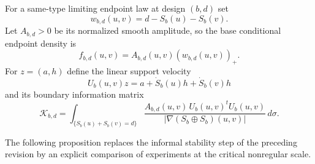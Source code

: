For a same-type limiting endpoint law at design $(b,d)$ set
\begin{equation}\label{eq:v21-base-defining-function}
 w_{b,d}(u,v)=d-S_b(u)-S_b(v).
\end{equation}
Let $A_{b,d}>0$ be its normalized smooth amplitude, so the base conditional
endpoint density is
\[
 f_{b,d}(u,v)=A_{b,d}(u,v)(w_{b,d}(u,v))_+.
\]
For $z=(a,h)$ define the linear support velocity
\begin{equation}\label{eq:v21-support-velocity}
 U_b(u,v)z=a+\dot S_b(u)h+\dot S_b(v)h
\end{equation}
and its boundary information matrix
\begin{equation}\label{eq:v21-information-matrix}
 \mathcal K_{b,d}
 =\int_{\{S_b(u)+S_b(v)=d\}}
 \frac{A_{b,d}(u,v)\,U_b(u,v)^tU_b(u,v)}
 {|\nabla(S_b\oplus S_b)(u,v)|}\,d\sigma.
\end{equation}

The following proposition replaces the informal stability step of the
preceding revision by an explicit comparison of experiments at the critical
nonregular scale.

